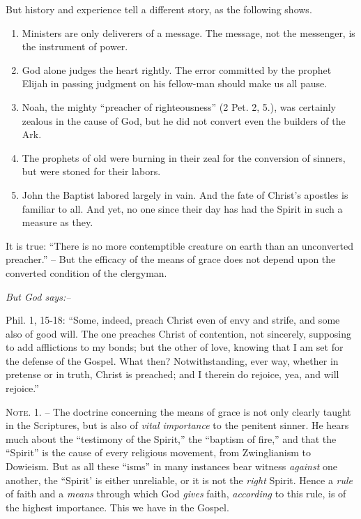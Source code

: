 \documentclass[
]{book}
\begin{document}
But history and experience tell a different story, as the following shows.

\begin{enumerate}
\def\labelenumi{\arabic{enumi}.}
\item
  Ministers are only deliverers of a message. The message, not the messenger, is the instrument of power.
\item
  God alone judges the heart rightly. The error committed by the prophet Elijah in passing judgment on his fellow-man should make us all pause.
\item
  Noah, the mighty ``preacher of righteousness'' (2 Pet. 2, 5.), was certainly zealous in the cause of God, but he did not convert even the builders of the Ark.
\item
  The prophets of old were burning in their zeal for the conversion of sinners, but were stoned for their labors.
\item
  John the Baptist labored largely in vain. And the fate of Christ's apostles is familiar to all. And yet, no one since their day has had the Spirit in such a measure as they.
\end{enumerate}

It is true: ``There is no more contemptible creature on earth than an unconverted preacher.'' -- But the efficacy of the means of grace does not depend upon the converted condition of the clergyman.

\begin{center}
\textsl{But God says:--}
\end{center}

Phil. 1, 15-18: ``Some, indeed, preach Christ even of envy and strife, and some also of good will. The one preaches Christ of contention, not sincerely, supposing to add afflictions to my bonds; but the other of love, knowing that I am set for the defense of the Gospel. What then? Notwithstanding, ever way, whether in pretense or in truth, Christ is preached; and I therein do rejoice, yea, and will rejoice.''

\textsc{Note. 1. --} The doctrine concerning the means of grace is not only clearly taught in the Scriptures, but is also of \emph{vital importance} to the penitent sinner. He hears much about the ``testimony of the Spirit,'' the ``baptism of fire,'' and that the ``Spirit'' is the cause of every religious movement, from Zwinglianism to Dowieism. But as all these ``isms'' in many instances bear witness \emph{against} one another, the ``Spirit' is either unreliable, or it is not the \emph{right} Spirit. Hence a \emph{rule} of faith and a \emph{means} through which God \emph{gives} faith, \emph{according} to this rule, is of the highest importance. This we have in the Gospel.
\end{document}

